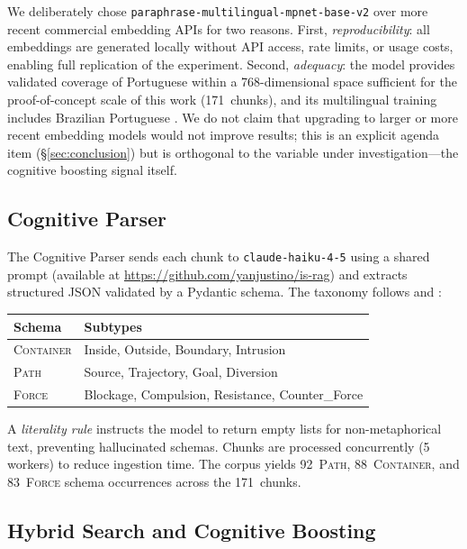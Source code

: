 \documentclass[11pt,a4paper]{article}
\begin{document}
We deliberately chose \texttt{paraphrase-multilingual-mpnet-base-v2}
over more recent commercial embedding APIs for two reasons.
First, \emph{reproducibility}: all embeddings are generated locally
without API access, rate limits, or usage costs, enabling full
replication of the experiment.
Second, \emph{adequacy}: the model provides validated coverage of
Portuguese within a 768-dimensional space sufficient for the
proof-of-concept scale of this work (171~chunks), and its
multilingual training includes Brazilian Portuguese
\citep{souza2020bertimbau}.
We do not claim that upgrading to larger or more recent embedding
models would not improve results; this is an explicit agenda item
(\S\ref{sec:conclusion}) but is orthogonal to the variable under
investigation—the cognitive boosting signal itself.

\subsection{Cognitive Parser}

The Cognitive Parser sends each chunk to
\texttt{claude-haiku-4-5} \citep{anthropic2024} using a shared prompt
(available at \url{https://github.com/yanjustino/is-rag}) and extracts structured JSON validated by
a Pydantic schema. The taxonomy follows \citet{lakoff1980} and
\citet{talmy1988}:

\begin{center}
\small
\begin{tabular}{ll}
\toprule
\textbf{Schema} & \textbf{Subtypes} \\
\midrule
\textsc{Container} & Inside, Outside, Boundary, Intrusion \\
\textsc{Path}      & Source, Trajectory, Goal, Diversion \\
\textsc{Force}     & Blockage, Compulsion, Resistance, Counter\_Force \\
\bottomrule
\end{tabular}
\end{center}

A \emph{literality rule} instructs the model to return empty lists for
non-metaphorical text, preventing hallucinated schemas.
Chunks are processed concurrently (5 workers) to reduce ingestion
time.
The corpus yields 92~\textsc{Path}, 88~\textsc{Container}, and
83~\textsc{Force} schema occurrences across the 171~chunks.

\subsection{Hybrid Search and Cognitive Boosting}
\label{sec:boosting}
\end{document}
